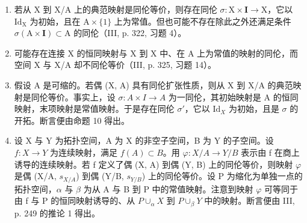 \begin{enumerate}
\def\labelenumi{\arabic{enumi})}
\item
  若从 X 到 X/A 上的典范映射是同伦等价，则存在同伦 \(\sigma\colon\mathrm{X}\times\mathbf{I}\to\mathrm{X}\)，它以 \(\mathrm{Id}_{\mathrm{X}}\) 为初始，且在 \(\mathrm{A}\times\{1\}\) 上为常值。但也可能不存在除此之外还满足条件 \(\sigma(\mathrm{A}\times\mathbf{I})\subset\mathrm{A}\) 的同伦（III, p. 322, 习题 4）。
\item
  可能存在连接 X 的恒同映射与 X 到 X 中、在 A 上为常值的映射的同伦，而空间 X 与 X/A 却不同伦等价（III, p. 325, 习题 14）。
\item
  假设 A 是可缩的。若偶 (X, A) 具有同伦扩张性质，则从 X 到 X/A 的典范映射是同伦等价。事实上，设 \(\sigma\colon A \times I \to A\) 为一同伦，其初始映射是 A 的恒同映射，末项映射是常值映射。于是存在同伦 \(\sigma'\)，它以 \(\mathrm{Id}_{X}\) 为初始，且是 \(\sigma\) 的开拓。断言便由命题 10 得出。
\item
  设 X 与 Y 为拓扑空间，A 为 X 的非空子空间，B 为 Y 的子空间。设 \(f: X \to Y\) 为连续映射，满足 \(f(A) \subset B\)。用 \(\varphi: X/A \to Y/B\) 表示由 f 在商上诱导的连续映射。若 f 定义了偶 (X, A) 到偶 (Y, B) 上的同伦等价，则映射 \(\varphi\) 是偶 (X/A, \(s_{X/A}\)) 到偶 (Y/B, \(s_{Y/B}\)) 上的同伦等价。设 P 为缩化为单独一点的拓扑空间，\(\alpha\) 与 \(\beta\) 为从 A 与 B 到 P 中的常值映射。注意到映射 \(\varphi\) 可等同于由 f 与 P 的恒同映射诱导的、从 \(P \cup_{\alpha} X\) 到 \(P \cup_{\beta} Y\) 中的映射。断言便由 III, p. 249 的推论 1 得出。
\end{enumerate}

